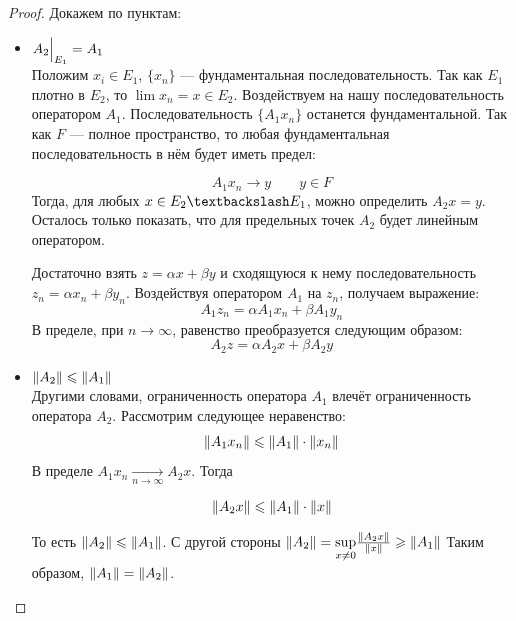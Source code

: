 \documentclass[12pt]{article}
\begin{document}
		\begin{proof}
			Докажем по пунктам:
			\begin{itemize}
				\item $A_2 \Big|_{E_1}^{} = A_1$ \\
				Положим $x_i \in E_1$, $\{x_n\}$ --- фундаментальная последовательность. Так как $E_1$ плотно в $E_2$, то
				$\lim x_n = x\in E_2$. Воздействуем на нашу последовательность оператором $A_1$.
				Последовательность $\{A_1 x_n\}$ останется фундаментальной. Так как $F$ --- полное пространство, 
				то любая фундаментальная последовательность в нём будет иметь предел:
		
				$$A_1x_n \rightarrow y \qquad y \in F$$
				Тогда, для любых $x \in E_2 \textbackslash E_1$, можно определить $A_2 x = y$. Осталось только 
				показать, что для предельных точек $A_2$ будет линейным оператором.
		
				Достаточно взять $z = \alpha x + \beta y$ и сходящуюся к нему последовательность $z_n = \alpha x_n + \beta y_n$.
				Воздействуя оператором $A_1$ на $z_n$, получаем выражение:
				$$A_1 z_n = \alpha A_1 x_n + \beta A_1 y_n$$
				В пределе, при $n \rightarrow \infty$, равенство преобразуется следующим образом:
				$$A_2 z = \alpha A_2 x + \beta A_2 y$$
			
			
				\item $\left\| A_2 \right\| \leqslant \left\| A_1 \right\|$ \\
				Другими словами, ограниченность оператора $A_1$ влечёт ограниченность оператора $A_2$. Рассмотрим следующее 
				неравенство:
				$$\left\| A_1 x_n \right\| \leqslant \left\| A_1 \right\| \cdot \left\| x_n \right\|$$
				В пределе $A_1 x_n \underset{n \rightarrow \infty}{\rightarrow} A_2 x$. Тогда
		
				$$\left\| A_2 x \right\| \leqslant \left\| A_1 \right\| \cdot \left\| x \right\|$$
		
				То есть $\left\| A_2 \right\| \leqslant \left\| A_1 \right\|$. С другой стороны 
				$\left\| A_2 \right\| = \underset{x\neq 0}{\sup} \frac{\left\| A_2x \right\|}{\left\| x \right\|} \geqslant \left\| A_1 \right\|$
				Таким образом, $\left\| A_1 \right\| = \left\| A_2 \right\|$.
			\end{itemize}
		\end{proof}
	
\end{document}
